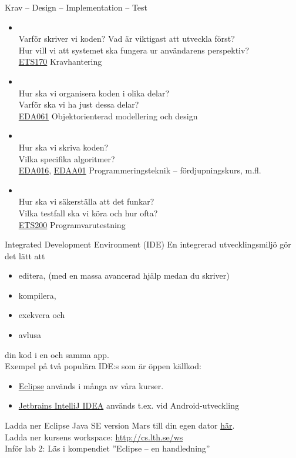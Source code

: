 \documentclass{lecturenotes}
\begin{document}
\begin{Slide}{Krav -- Design -- Implementation -- Test}\footnotesize
\begin{itemize}
\item {} \\ Varför skriver vi koden? Vad är viktigast att utveckla först? \\ Hur vill vi att systemet ska fungera ur användarens perspektiv? \\  \href{http://cs.lth.se/ets170}{ETS170} Kravhantering
\item {} \\ Hur ska vi organisera koden i olika delar? \\ Varför ska vi ha just dessa delar?  \\  \href{http://cs.lth.se/eda061}{EDA061} Objektorienterad modellering och design
\item {} \\ Hur ska vi skriva koden? \\ Vilka specifika algoritmer? \\ 
\href{http://cs.lth.se/eda016}{EDA016}, \href{http://cs.lth.se/edaa01vt}{EDAA01} Programmeringsteknik -- fördjupningskurs, m.fl.
\item {} \\ Hur ska vi säkerställa att det funkar? \\ Vilka testfall ska vi köra och hur ofta? \\  \href{http://cs.lth.se/ets200}{ETS200} Programvarutestning
\end{itemize}
\end{Slide}


\begin{Slide}{Integrated Development Environment (IDE)} \footnotesize
En integrerad utvecklingsmiljö gör det lätt att 
\begin{itemize}
\item editera, (med en massa avancerad hjälp medan du skriver)
\item kompilera, 
\item exekvera och 
\item avlusa  
\end{itemize} 
din kod i en och samma app. \\ \vspace{1em}
Exempel på två populära IDE:s som är öppen källkod:
\begin{itemize}
\item \href{https://eclipse.org/}{Eclipse} används i många av våra kurser.
\item \href{https://www.jetbrains.com/idea/}{Jetbrains IntelliJ IDEA} används t.ex. vid Android-utveckling
\end{itemize}
Ladda ner Eclipse Java SE version Mars till din egen dator \href{http://www.eclipse.org/downloads/packages/eclipse-ide-java-developers/marsr}{här}. \\ 
Ladda ner kursens workspace: \url{http://cs.lth.se/ws} \\
Inför lab 2: Läs i kompendiet ''Eclipse -- en handledning'' 
\end{Slide}
\end{document}
